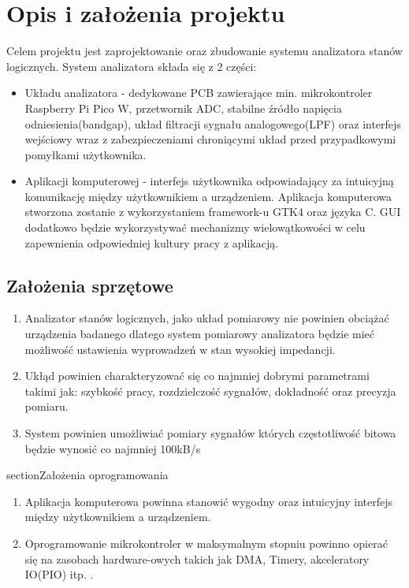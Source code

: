 \section{Opis i założenia projektu}
    Celem projektu jest zaprojektowanie oraz zbudowanie systemu analizatora stanów logicznych.
    System analizatora składa się z 2 części:
    \begin{itemize}
        \item Układu analizatora - dedykowane PCB zawierające min. mikrokontroler
        Raspberry Pi Pico W, przetwornik ADC, stabilne źródło napięcia odniesienia(bandgap),
        układ filtracji sygnału analogowego(LPF) oraz interfejs wejściowy wraz z zabezpieczeniami
        chroniącymi układ przed przypadkowymi pomyłkami użytkownika.
        \item Aplikacji komputerowej - interfejs użytkownika odpowiadający za intuicyjną komunikację 
        między użytkownikiem a urządzeniem. Aplikacja komputerowa stworzona zostanie z wykorzystaniem
        framework-u GTK4 oraz języka C. GUI dodatkowo będzie wykorzystywać mechanizmy wielowątkowości w celu
        zapewnienia odpowiedniej kultury pracy z aplikacją. 
    \end{itemize}

\subsection{Założenia sprzętowe}
    \begin{enumerate}
        \item Analizator stanów logicznych, jako układ pomiarowy nie powinien obciążać urządzenia badanego dlatego
        system pomiarowy analizatora będzie mieć możliwość ustawienia wyprowadzeń w stan wysokiej impedancji.
        \item Ukłąd powinien charakteryzować się co najmniej dobrymi parametrami takimi jak:
        szybkość pracy, rozdzielczość sygnałów, dokładność oraz precyzja pomiaru.
        \item System powinien umożliwiać pomiary sygnałów których częstotliwość bitowa będzie wynosić co najmniej
        100kB/s %
    \end{enumerate}

    section{Założenia oprogramowania}
    \begin{enumerate}
        \item Aplikacja komputerowa powinna stanowić wygodny oraz intuicyjny interfejs między użytkownikiem
        a urządzeniem.
        \item Oprogramowanie mikrokontroler w maksymalnym stopniu powinno opierać się na zasobach
        hardware-owych takich jak DMA, Timery, akceleratory IO(PIO) itp. .
    \end{enumerate}
    
